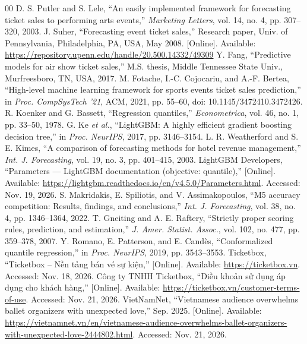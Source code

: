 \documentclass{IEEEtran}
\begin{document}
\begin{thebibliography}{00}
 D. S. Putler and S. Lele, ``An easily implemented framework for forecasting ticket sales to performing arts events,'' \textit{Marketing Letters}, vol. 14, no. 4, pp. 307--320, 2003.
 J. Suher, ``Forecasting event ticket sales,'' Research paper, Univ. of Pennsylvania, Philadelphia, PA, USA, May 2008. [Online]. Available: \url{https://repository.upenn.edu/handle/20.500.14332/49309}
 Y. Fang, ``Predictive models for air show ticket sales,'' M.S. thesis, Middle Tennessee State Univ., Murfreesboro, TN, USA, 2017.
 M. Fotache, I.-C. Cojocariu, and A.-F. Bertea, ``High-level machine learning framework for sports events ticket sales prediction,'' in \textit{Proc. CompSysTech '21}, ACM, 2021, pp. 55--60, doi: 10.1145/3472410.3472426.
 R. Koenker and G. Bassett, ``Regression quantiles,'' \textit{Econometrica}, vol. 46, no. 1, pp. 33--50, 1978.
 G. Ke \textit{et al.}, ``LightGBM: A highly efficient gradient boosting decision tree,'' in \textit{Proc. NeurIPS}, 2017, pp. 3146--3154.
 L. R. Weatherford and S. E. Kimes, ``A comparison of forecasting methods for hotel revenue management,'' \textit{Int. J. Forecasting}, vol. 19, no. 3, pp. 401--415, 2003.
 LightGBM Developers, ``Parameters --- LightGBM documentation (objective: quantile),'' [Online]. Available: \url{https://lightgbm.readthedocs.io/en/v4.5.0/Parameters.html}. Accessed: Nov. 19, 2026.
 S. Makridakis, E. Spiliotis, and V. Assimakopoulos, ``M5 accuracy competition: Results, findings, and conclusions,'' \textit{Int. J. Forecasting}, vol. 38, no. 4, pp. 1346--1364, 2022.
 T. Gneiting and A. E. Raftery, ``Strictly proper scoring rules, prediction, and estimation,'' \textit{J. Amer. Statist. Assoc.}, vol. 102, no. 477, pp. 359--378, 2007.
 Y. Romano, E. Patterson, and E. Candès, ``Conformalized quantile regression,'' in \textit{Proc. NeurIPS}, 2019, pp. 3543--3553.
 Ticketbox, ``Ticketbox -- Nền tảng bán vé sự kiện,'' [Online]. Available: \url{https://ticketbox.vn}. Accessed: Nov. 18, 2026.
 Công ty TNHH Ticketbox, ``Điều khoản sử dụng áp dụng cho khách hàng,'' [Online]. Available: \url{https://ticketbox.vn/customer-terms-of-use}. Accessed: Nov. 21, 2026.
 VietNamNet, ``Vietnamese audience overwhelms ballet organizers with unexpected love,'' Sep. 2025. [Online]. Available: \url{https://vietnamnet.vn/en/vietnamese-audience-overwhelms-ballet-organizers-with-unexpected-love-2444802.html}. Accessed: Nov. 21, 2026.
\end{thebibliography}
\end{document}
